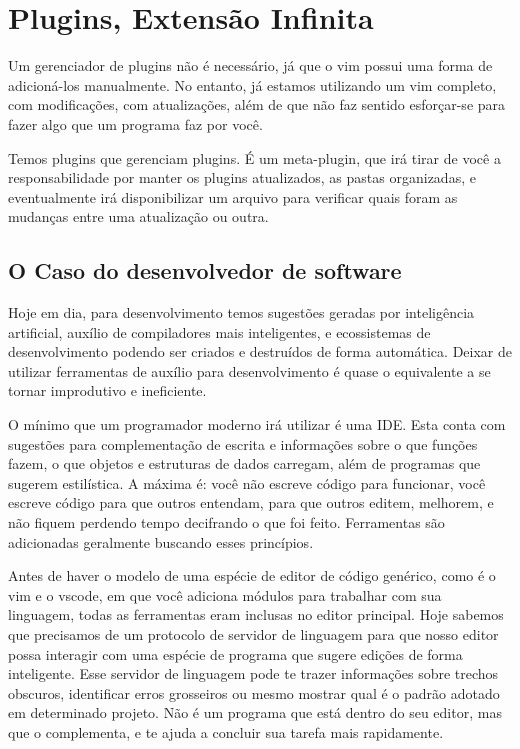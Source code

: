 \chapter{Plugins, Extensão Infinita}
Um gerenciador de plugins não é necessário, já que o vim possui uma forma de adicioná-los manualmente.
No entanto, já estamos utilizando um vim completo, com modificações, com atualizações,
além de que não faz sentido esforçar-se para fazer algo que um programa faz por você.

\begin{figure}
\end{figure}


Temos plugins que gerenciam plugins.
É um meta-plugin, que irá tirar de você a responsabilidade por manter os plugins atualizados,
as pastas organizadas, e eventualmente irá disponibilizar um arquivo para verificar quais foram
as mudanças entre uma atualização ou outra.

\section{O Caso do desenvolvedor de software}
Hoje em dia, para desenvolvimento temos sugestões geradas por inteligência artificial,
auxílio de compiladores mais inteligentes,
e ecossistemas de desenvolvimento podendo ser criados e destruídos de forma automática.
Deixar de utilizar ferramentas de auxílio para desenvolvimento é quase o equivalente a se tornar
improdutivo e ineficiente.

O mínimo que um programador moderno irá utilizar é uma IDE. Esta conta com sugestões para complementação
de escrita e informações sobre o que funções fazem, o que objetos e estruturas de dados carregam, além
de programas que sugerem estilística.
A máxima é: você não escreve código para funcionar, você escreve código para que outros entendam,
para que outros editem, melhorem, e não fiquem perdendo tempo decifrando o que foi feito.
Ferramentas são adicionadas geralmente buscando esses princípios.

Antes de haver o modelo de uma espécie de editor de código genérico, como é o vim e o vscode,
em que você adiciona módulos para trabalhar com sua linguagem, todas as ferramentas eram
inclusas no editor principal.
Hoje sabemos que precisamos de um protocolo de servidor de linguagem 
para que nosso editor possa
interagir com uma espécie de programa que sugere edições de forma inteligente.
Esse servidor de linguagem pode te trazer informações sobre trechos obscuros, identificar erros grosseiros
ou mesmo mostrar qual é o padrão adotado em determinado projeto.
Não é um programa que está dentro do seu editor, mas que o complementa,
e te ajuda a concluir sua tarefa mais rapidamente.

